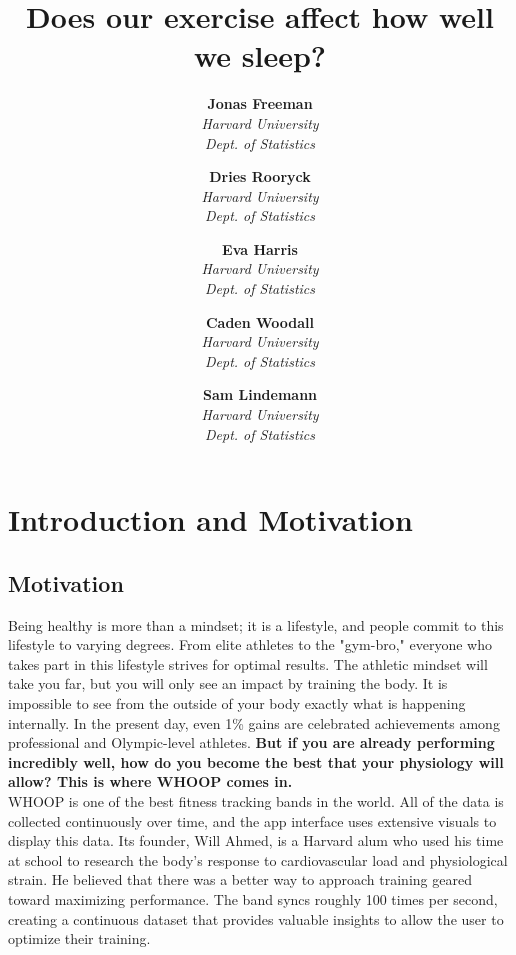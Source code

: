 \documentclass{article}
\begin{document}
\title{\textbf{\Large Does our exercise affect how well we sleep? }}

\author{
    \textbf{Jonas Freeman} \\
    \textit{Harvard University} \\
    \textit{Dept. of Statistics}
    \and
    \textbf{Dries Rooryck} \\
    \textit{Harvard University} \\
    \textit{Dept. of Statistics}
    \and
    \textbf{Eva Harris} \\
    \textit{Harvard University} \\
    \textit{Dept. of Statistics}
    \and
    \textbf{Caden Woodall} \\
    \textit{Harvard University} \\
    \textit{Dept. of Statistics}
    \and
    \textbf{Sam Lindemann} \\
    \textit{Harvard University} \\
    \textit{Dept. of Statistics}
}
\date{}

\maketitle

\section{\hspace{0.5em} Introduction and Motivation}

\subsection{Motivation}

Being healthy is more than a mindset; it is a lifestyle, and people commit to this lifestyle to varying degrees. From elite athletes to the "gym-bro," everyone who takes part in this lifestyle strives for optimal results. The athletic mindset will take you far, but you will only see an impact by training the body. It is impossible to see from the outside of your body exactly what is happening internally. In the present day, even 1\% gains are celebrated achievements among professional and Olympic-level athletes. \textbf{But if you are already performing incredibly well, how do you become the best that your physiology will allow? This is where WHOOP comes in.} \\

WHOOP is one of the best fitness tracking bands in the world. All of the data is collected continuously over time, and the app interface uses extensive visuals to display this data. Its founder, Will Ahmed, is a Harvard alum who used his time at school to research the body's response to cardiovascular load and physiological strain. He believed that there was a better way to approach training geared toward maximizing performance. The band syncs roughly 100 times per second, creating a continuous dataset that provides valuable insights to allow the user to optimize their training. \cite{perlman2024} \\
\end{document}
